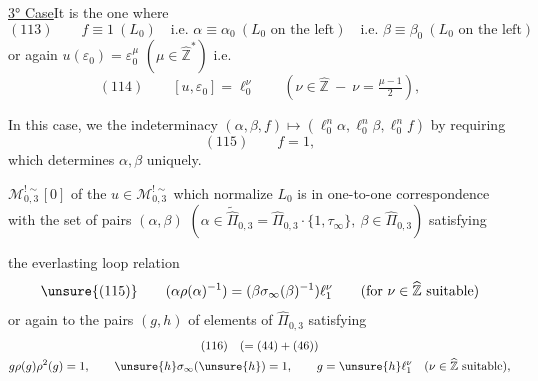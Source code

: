 \uline{3° Case}\quad It is the one where
\[
 (113)\qquad
 f\equiv1\ (L_0)
 \quad\text{i.e. }\alpha\equiv\alpha_0\ (L_0\text{ on the left})
 \quad\text{i.e. }\beta\equiv\beta_0\ (L_0\text{ on the left})
\]
or again $u(\varepsilon_0)=\varepsilon_0^\mu$
$(\mu\in\widehat{\mathbb Z}^{*})$ i.e.
\[
 (114)\qquad
 [u,\varepsilon_0]=\ell_0^\nu
 \qquad
 (\nu\in\widehat{\mathbb Z}\ -\ \nu=\tfrac{\mu-1}{2}),
\]


In this case, we  the indeterminacy
$(\alpha,\beta,f)\longmapsto
(\ell_0^n\alpha,\ell_0^n\beta,\ell_0^n f)$
by requiring
\[
 (115)\qquad f=1,
\]
which determines $\alpha,\beta$ uniquely.

$\mathcal M_{0,3}^{!\sim}[0]$ of the $u\in\mathcal M_{0,3}^{!\sim}$
which normalize $L_0$ is in one-to-one correspondence with the set of pairs
$(\alpha,\beta)$
$(\alpha\in\widetilde{\widehat{\Pi}}_{0,3}
=\widehat{\Pi}_{0,3}\cdot\{1,\tau_\infty\},
\ \beta\in\widehat{\Pi}_{0,3})$ satisfying



the everlasting loop relation
\[
 \unsure{(115)}\qquad
 (\alpha\rho(\alpha)^{-1})
 =(\beta\sigma_\infty(\beta)^{-1})\ell_1^\nu
 \qquad(\text{for }\nu\in\widehat{\mathbb Z}\text{ suitable})
\]
or again to the pairs $(g,h)$
of elements of $\widehat{\Pi}_{0,3}$ satisfying
\[
 \begin{gathered}
 (116)\quad (=(44)+(46))\\
 g\rho(g)\rho^2(g)=1,\qquad
 \unsure{h}\sigma_\infty(\unsure{h})=1,\qquad
 g=\unsure{h}\ell_1^\nu\quad
 (\nu\in\widehat{\mathbb Z}\text{ suitable}),
 \end{gathered}
\]

